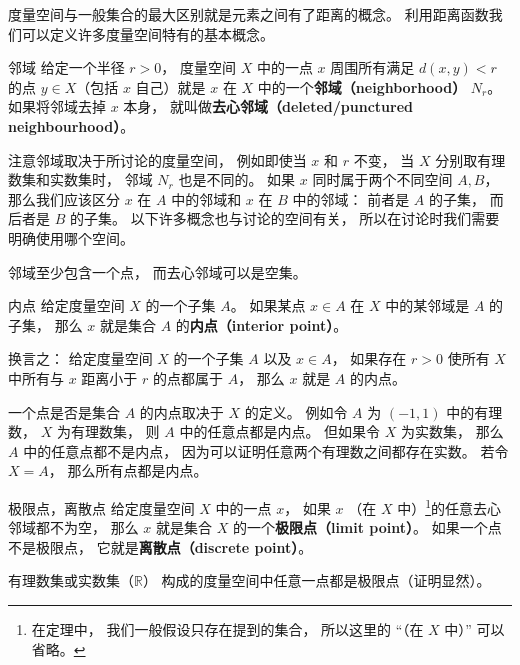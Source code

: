 
度量空间与一般集合的最大区别就是元素之间有了距离的概念。 利用距离函数我们可以定义许多度量空间特有的基本概念。

\begin{definition}{邻域}
给定一个半径 $r > 0$， 度量空间 $X$ 中的一点 $x$ 周围所有满足 $d(x, y) < r$ 的点 $y \in X$（包括 $x$ 自己）就是 $x$ 在 $X$ 中的一个\textbf{邻域（neighborhood）} $N_r$。 如果将邻域去掉 $x$ 本身， 就叫做\textbf{去心邻域（deleted/punctured neighbourhood）}。
\end{definition}
注意邻域取决于所讨论的度量空间， 例如即使当 $x$ 和 $r$ 不变， 当 $X$ 分别取有理数集和实数集时， 邻域 $N_r$ 也是不同的。 如果 $x$ 同时属于两个不同空间 $A, B$， 那么我们应该区分 $x$ 在 $A$ 中的邻域和 $x$ 在 $B$ 中的邻域： 前者是 $A$ 的子集， 而后者是 $B$ 的子集。 以下许多概念也与讨论的空间有关， 所以在讨论时我们需要明确使用哪个空间。

邻域至少包含一个点， 而去心邻域可以是空集。

\begin{definition}{内点}\label{def_Metri2_2}
给定度量空间 $X$ 的一个子集 $A$。 如果某点 $x\in A$ 在 $X$ 中的某邻域是 $A$ 的子集， 那么 $x$ 就是集合 $A$ 的\textbf{内点（interior point）}。

换言之： 给定度量空间 $X$ 的一个子集 $A$ 以及 $x \in A$， 如果存在 $r > 0$ 使所有 $X$ 中所有与 $x$ 距离小于 $r$ 的点都属于 $A$， 那么 $x$ 就是 $A$ 的内点。
\end{definition}

\begin{example}{}\label{ex_Metri2_1}
一个点是否是集合 $A$ 的内点取决于 $X$ 的定义。 例如令 $A$ 为 $(-1, 1)$ 中的有理数， $X$ 为有理数集， 则 $A$ 中的任意点都是内点。 但如果令 $X$ 为实数集， 那么 $A$ 中的任意点都不是内点， 因为可以证明任意两个有理数之间都存在实数。%
若令 $X = A$， 那么所有点都是内点。
\end{example}

\begin{definition}{极限点，离散点}\label{def_Metri2_3}
给定度量空间 $X$ 中的一点 $x$， 如果 $x$ （在 $X$ 中）\footnote{在定理中， 我们一般假设只存在提到的集合， 所以这里的 “（在 $X$ 中）” 可以省略。}的任意去心邻域都不为空， 那么 $x$ 就是集合 $X$ 的一个\textbf{极限点（limit point）}。 如果一个点不是极限点， 它就是\textbf{离散点（discrete point）}。
\end{definition}
\begin{example}{}\label{ex_Metri2_2}
有理数集或实数集（$\mathbb R$） 构成的度量空间中任意一点都是极限点（证明显然）。
\end{example}

